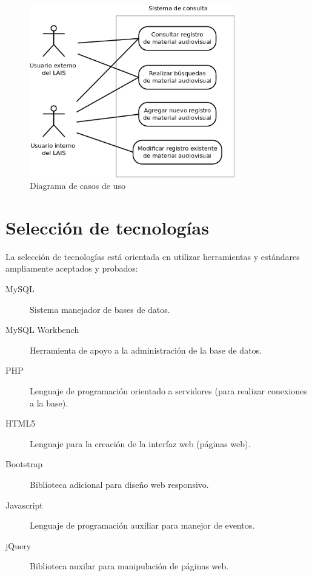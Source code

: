 \documentclass{beamer}
\begin{document}
\begin{frame}
	\begin{figure}[H]
		\centering
		\includegraphics[width=0.8\textwidth]{CasosDeUso.png}
		\caption{Diagrama de casos de uso}
		\label{fig:caso_de_uso}
	\end{figure}
\end{frame}

\section{Selección de tecnologías}
\begin{frame}
	La selección de tecnologías está orientada en utilizar herramientas y estándares ampliamente aceptados y probados:
	\begin{description}
		\item[MySQL] Sistema manejador de bases de datos.
		\item[MySQL Workbench] Herramienta de apoyo a la administración de la base de datos.
		\item[PHP] Lenguaje de programación orientado a servidores (para realizar conexiones a la base).
		\item[HTML5] Lenguaje para la creación de la interfaz web (páginas web).
		\item[Bootstrap] Biblioteca adicional para diseño web responsivo.
		\item[Javascript] Lenguaje de programación auxiliar para manejor de eventos.
		\item[jQuery] Biblioteca auxilar para manipulación de páginas web.
	\end{description}
\end{frame}
\end{document}
